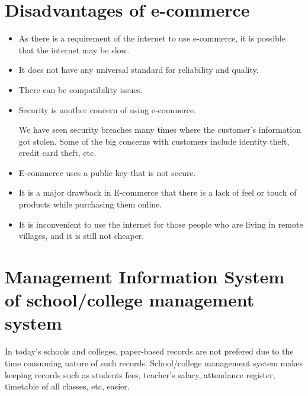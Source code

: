\documentclass[12pt, a4paper]{article}
\begin{document}
\section{Disadvantages of e-commerce}%
\begin{itemize}
  \item As there is a requirement of the internet to use e-commerce, it is
    possible that the internet may be slow.
  \item It does not have any universal standard for reliability and quality.
  \item There can be compatibility issues.
  \item Security is another concern of using e-commerce.

    We have seen security breaches many times where the customer's information
    got stolen. Some of the big concerns with customers include identity
    theft, credit card theft, etc.

  \item E-commerce uses a public key that is not secure.

  \item It is a major drawback in E-commerce that there is a lack of feel or
    touch of products while purchasing them online.

  \item It is inconvenient to use the internet for those people who are living
    in remote villages, and it is still not cheaper.
\end{itemize}%

\section{Management Information System of school/college management system}%
In today's schools and colleges, paper-based records are not prefered due to
the time consuming nature of such records. School/college management system
makes keeping records such as students fees, teacher's salary, attendance
register, timetable of all classes, etc, easier.
\end{document}
